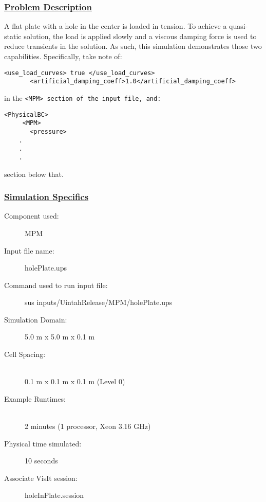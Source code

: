 \subsubsection*{\underline{Problem Description}}
A flat plate with a hole in the center is loaded in tension.  To achieve a
quasi-static solution, the load is applied slowly and a viscous damping force
is used to reduce transients in the solution.  As such, this simulation
demonstrates those two capabilities.  Specifically, take note of:
\begin{Verbatim}[fontsize=\footnotesize]
       <use_load_curves> true </use_load_curves>
       <artificial_damping_coeff>1.0</artificial_damping_coeff>
\end{Verbatim}
in the \tt <MPM> \normalfont section of the input file, and:
\begin{Verbatim}[fontsize=\footnotesize]
   <PhysicalBC>
     <MPM>
       <pressure>
	.
	.
	.
\end{Verbatim}
section below that.

 
\subsubsection*{\underline{Simulation Specifics}}
\begin{description} 
\item [Component used:] \hfill MPM
\item [Input file name:] \hfill holePlate.ups
\item [Command used to run input file:]\hfill \newline sus inputs/UintahRelease/MPM/holePlate.ups
\item [Simulation Domain:]\hfill 5.0 m x 5.0 m x 0.1 m

\item [Cell Spacing:]\hfill \\ 
  0.1 m x 0.1 m x 0.1 m (Level 0)

\item [Example Runtimes:] \hfill \\
 2 minutes  (1 processor, Xeon 3.16 GHz)\\

\item [Physical time simulated:] \hfill 10 seconds

\item [Associate VisIt session:] \hfill holeInPlate.session

\end{description}

